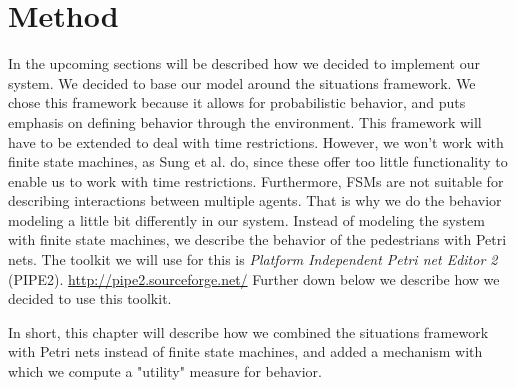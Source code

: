 \documentclass[11pt, a4paper]{book}
\begin{document}
\chapter{Method}
In the upcoming sections will be described how we decided to implement our system. We decided to base our model around the situations framework. We chose this framework because it allows for probabilistic behavior, and puts emphasis on defining behavior through the environment. This framework will have to be extended to deal with time restrictions. However, we won't work with finite state machines, as Sung et al. do, since these offer too little functionality to enable us to work with time restrictions. Furthermore, FSMs are not suitable for describing interactions between multiple agents. That is why we do the behavior modeling a little bit differently in our system. Instead of modeling the system with finite state machines, we describe the behavior of the pedestrians with Petri nets.  The toolkit we will use for this is \emph{Platform Independent Petri net Editor 2} (PIPE2). \url{http://pipe2.sourceforge.net/} Further down below we describe how we decided to use this toolkit.

In short, this chapter will describe how we combined the situations framework with Petri nets instead of finite state machines, and added a mechanism with which we compute a "utility" measure for behavior.
\end{document}
